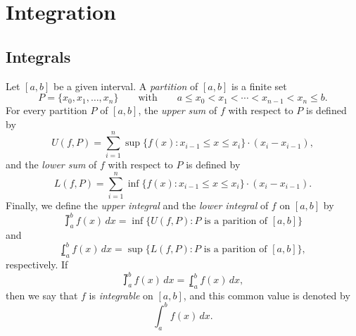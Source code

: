 \chapter{Integration}
\section{Integrals}
\begin{definition}
  Let $[a, b]$ be a given interval.
  A \emph{partition} of $[a, b]$ is a finite set
  \begin{equation*}
    P = \{x_0, x_1, \dots, x_n\}
    \qquad \text{with} \qquad
    a \leq x_0 < x_1 < \cdots < x_{n-1} < x_n \leq b.
  \end{equation*}
  For every partition $P$ of $[a, b]$, the \emph{upper sum} of $f$ with
  respect to $P$ is defined by
  \begin{equation*}
    U(f, P) = \sum_{i=1}^n \sup\{f(x): x_{i-1} \leq x \leq x_i\} \cdot
    (x_i - x_{i-1}),
  \end{equation*}
  and the \emph{lower sum} of $f$ with respect to $P$ is defined by
  \begin{equation*}
    L(f, P) = \sum_{i=1}^n \inf\{f(x): x_{i-1} \leq x \leq x_i\} \cdot
    (x_i - x_{i-1}).
  \end{equation*}
  Finally, we define the \emph{upper integral} and the
  \emph{lower integral} of $f$ on $[a, b]$ by
  \begin{equation*}
    \upint_a^b f(x) \, dx
    = \inf\{U(f, P): \text{$P$ is a parition of $[a, b]$}\}
  \end{equation*}
  and
  \begin{equation*}
    \lowint_a^b f(x) \, dx
    = \sup\{L(f, P): \text{$P$ is a parition of $[a, b]$}\},
  \end{equation*}
  respectively.
  If
  \begin{equation*}
    \upint_a^b f(x) \, dx = \lowint_a^b f(x) \, dx,
  \end{equation*}
  then we say that $f$ is \emph{integrable} on $[a, b]$, and this
  common value is denoted by
  \begin{equation*}
    \int_a^b f(x) \, dx.
  \end{equation*}
\end{definition}